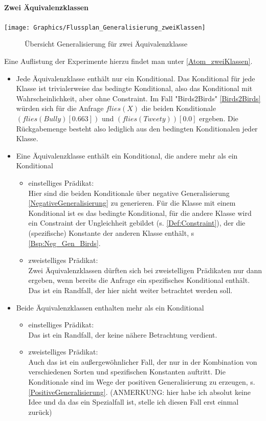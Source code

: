 \documentclass[a4paper, 11pt]{book}
\begin{document}
\paragraph{ Zwei Äquivalenzklassen}
\texttt{[image: Graphics/Flussplan\_Generalisierung\_zweiKlassen]}
\begin{figure}[h]
	\caption{Übersicht Generalisierung für zwei Äquivalenzklasse}
	\label{Fig_}
\end{figure}
Eine Auflistung der  Experimente hierzu findet man unter \ref{Atom_zweiKlassen}.
\begin{itemize}
\item Jede Äquivalenzklasse enthält nur ein Konditional. Das Konditional für jede Klasse ist trivialerweise das bedingte Konditional, also das Konditional mit Wahrscheinlichkeit, aber ohne Constraint. Im Fall "{}Birds2Birds"{} \ref{Birds2Birds} würden sich für die Anfrage $flies(X)$ die beiden Konditionale $ (flies(Bully)[0.663]) $ und $ (flies(Tweety))[0.0] $ ergeben. Die Rückgabemenge besteht also lediglich aus den bedingten Konditionalen jeder Klasse.
\item Eine Äquivalenzklasse enthält ein Konditional, die andere mehr als ein Konditional
\begin{itemize}
	\item einstelliges Prädikat:\\
	Hier sind die beiden Konditionale über negative Generalisierung \ref{NegativeGeneralisierung} zu generieren. Für die Klasse mit einem Konditional ist es das bedingte Konditional, für die andere Klasse wird ein Constraint der Ungleichheit gebildet (s. \ref{Def:Constraint}), der die (spezifische) Konstante der anderen Klasse enthält, s \ref{Bsp:Neg_Gen_Birds}. 
	\item zweistelliges Prädikat:\\
	Zwei Äquivalenzklassen dürften sich bei zweistelligen Prädikaten nur dann ergeben, wenn bereits die Anfrage ein spezifisches Konditional enthält. Das ist ein Randfall, der hier nicht weiter betrachtet werden soll. 
\end{itemize}
\item Beide Äquivalenzklassen enthalten mehr als ein Konditional
\begin{itemize}
	\item {einstelliges Prädikat:}\\
	Das ist ein Randfall, der keine nähere Betrachtung verdient.
	\item zweistelliges Prädikat:\\
	Auch das ist ein außergewöhnlicher Fall, der nur in der Kombination von verschiedenen Sorten und spezifischen Konstanten auftritt. Die Konditionale sind im Wege der positiven Generalisierung zu erzeugen, s. \ref{PositiveGeneralisierung}.
	(ANMERKUNG: hier habe ich absolut keine Idee und da das ein Spezialfall ist, stelle ich diesen Fall erst einmal zurück)
\end{itemize}
\end{itemize}
\end{document}
